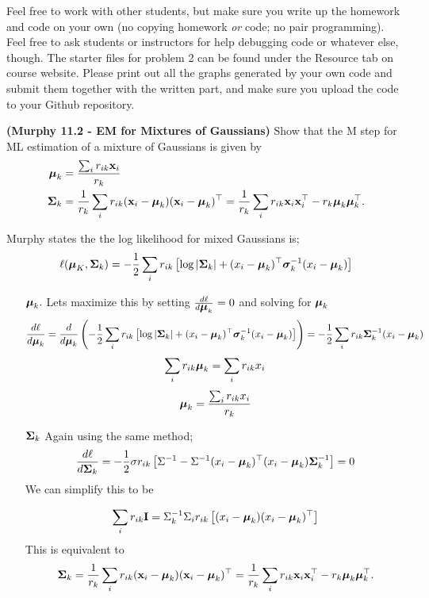 \documentclass[12pt,letterpaper,fleqn]{hmcpset}
\begin{document}
Feel free to work with other students, but make sure you write up the homework
and code on your own (no copying homework \textit{or} code; no pair programming).
Feel free to ask students or instructors for help debugging code or whatever else,
though.
\newline
\newline
The starter files for problem 2 can be found under the Resource tab on course website. Please print out all the graphs generated by your own code and submit them together with the written part, and make sure you upload the code to your Github repository.\\

\begin{problem}[1]
\textbf{(Murphy 11.2 - EM for Mixtures of Gaussians)} Show that the M step for ML
estimation of a mixture of Gaussians is given by
\begin{align*}
    \hbox{\boldmath$\mu$}_k &= \frac{\sum_i r_{ik}{\bf x}_i}{r_k}\\
    \hbox{\boldmath$\Sigma$}_k &= \frac{1}{r_k}\sum_i r_{ik}({\bf x}_i - \hbox{\boldmath$\mu$}_k)({\bf x}_i - \hbox{\boldmath$\mu$}_k)^\top = \frac{1}{r_k}\sum_i r_{ik}{\bf x}_i{\bf x}_i^\top - r_k\hbox{\boldmath$\mu$}_k\hbox{\boldmath$\mu$}_k^\top.
\end{align*}
\end{problem}
\begin{solution}
Murphy states the the log likelihood for mixed Gaussians is; 
$$ \ell (\hbox{\boldmath$\mu$}_K, \hbox{\boldmath$\Sigma$}_k) = -\frac{1}{2}\sum_i r_{ik} \left[ \log |\hbox{\boldmath$\Sigma$}_k| + (x_i-\hbox{\boldmath$\mu$}_k)^\top \hbox{\boldmath$\sigma$}_k^{-1}(x_i-\hbox{\boldmath$\mu$}_k)\right]$$
\begin{enumerate}
\item[$\hbox{\boldmath$\mu$}_k.$] Lets maximize this by setting $\frac{d\ell}{d\hbox{\boldmath$\mu$}_k} = 0 $ and solving for $\hbox{\boldmath$\mu$}_k$
$$ \frac{d\ell}{d\hbox{\boldmath$\mu$}_k}=\frac{d}{d\hbox{\boldmath$\mu$}_k}\left(-\frac{1}{2}\sum_i r_{ik} \left[ \log |\hbox{\boldmath$\Sigma$}_k| + (x_i-\hbox{\boldmath$\mu$}_k)^\top \hbox{\boldmath$\sigma$}_k^{-1}(x_i-\hbox{\boldmath$\mu$}_k)\right]\right) =  -\frac{1}{2}\sum_i r_{ik} \hbox{\boldmath$\Sigma$}_k^{-1}(x_i-\hbox{\boldmath$\mu$}_k)$$ 
$$\sum_i r_{ik} \hbox{\boldmath$\mu$}_k = \sum_i r_{ik} x_i$$
$$\hbox{\boldmath$\mu$}_k =  \frac{\sum_i r_{ik} x_i}{r_k} $$
\item[$\hbox{\boldmath$\Sigma$}_k$] Again using the same method; 
$$\frac{d\ell}{d \hbox{\boldmath$\Sigma$}_k} = -\frac{1}{2} \sigma r_{ik} \left[ \Sigma^{-1} - \Sigma^{-1} (x_i - \hbox{\boldmath$\mu$}_k) ^\top (x_i- \hbox{\boldmath$\mu$}_k)\hbox{\boldmath$\Sigma$}_k^{-1}\right]= 0$$
We can simplify this to be 

$$\sum_i r_{ik} \textbf{I} = \Sigma_k^{-1} \Sigma _i r_{ik} \left[(x_i - \hbox{\boldmath$\mu$}_k)(x_i - \hbox{\boldmath$\mu$}_k) ^\top \right]$$
This is equivalent to $$ \hbox{\boldmath$\Sigma$}_k = \frac{1}{r_k}\sum_i r_{ik}({\bf x}_i - \hbox{\boldmath$\mu$}_k)({\bf x}_i - \hbox{\boldmath$\mu$}_k)^\top = \frac{1}{r_k}\sum_i r_{ik}{\bf x}_i{\bf x}_i^\top - r_k\hbox{\boldmath$\mu$}_k\hbox{\boldmath$\mu$}_k^\top.$$
\end{enumerate}
\end{solution}
\newpage
\end{document}
